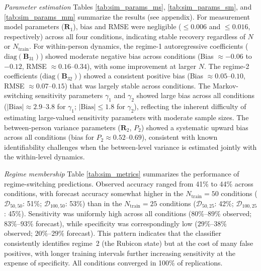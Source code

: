 \textit{Parameter estimation} Tables \ref{tab:sim_params_ms}, \ref{tab:sim_params_sm}, and \ref{tab:sim_params_mm} summarize the results (see appendix). For measurement model parameters ($\bm{R}_1$), bias and RMSE were negligible ($\leq 0.006$ and $\leq 0.016$, respectively) across all four conditions, indicating stable recovery regardless of $N$ or $N_{\text{train}}$. For within-person dynamics, the regime-1 autoregressive coefficients ($\text{diag}(\bm{B}_{31})$) showed moderate negative bias across conditions (Bias $\approx -0.06$ to $-0.12$, RMSE $\approx 0.16$--$0.34$), with some improvement at larger $N$. The regime-2 coefficients ($\text{diag}(\bm{B}_{32})$) showed a consistent positive bias (Bias $\approx 0.05$--$0.10$, RMSE $\approx 0.07$--$0.15$) that was largely stable across conditions. The Markov-switching sensitivity parameters $\gamma_1$ and $\gamma_2$ showed large bias across all conditions ($|\text{Bias}| \approx 2.9$--$3.8$ for $\gamma_1$; $|\text{Bias}| \leq 1.8$ for $\gamma_2$), reflecting the inherent difficulty of estimating large-valued sensitivity parameters with moderate sample sizes. The between-person variance parameters ($\bm{R}_2$, $P_2$) showed a systematic upward bias across all conditions (bias for $P_2 \approx 0.52$--$0.69$), consistent with known identifiability challenges when the between-level variance is estimated jointly with the within-level dynamics.

\textit{Regime membership}
Table \ref{tab:sim_metrics} summarizes the performance of regime-switching predictions. Observed accuracy ranged from 41\% to 44\% across conditions, with forecast accuracy somewhat higher in the $N_{\text{train}}=50$ conditions ($\mathcal{D}_{50,50}$: 51\%; $\mathcal{D}_{100,50}$: 53\%) than in the $N_{\text{train}}=25$ conditions ($\mathcal{D}_{50,25}$: 42\%; $\mathcal{D}_{100,25}$: 45\%). Sensitivity was uniformly high across all conditions ($80\%$--$89\%$ observed; $83\%$--$93\%$ forecast), while specificity was correspondingly low ($29\%$--$38\%$ observed; $20\%$--$29\%$ forecast). This pattern indicates that the classifier consistently identifies regime~2 (the Rubicon state) but at the cost of many false positives, with longer training intervals further increasing sensitivity at the expense of specificity. All conditions converged in 100\% of replications.

